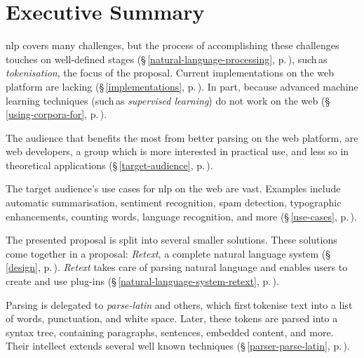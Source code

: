 
\begingroup
\let\clearpage\relax
\let\cleardoublepage\relax
\let\cleardoublepage\relax

\chapter*{Executive Summary}

\gls{nlp} covers many challenges, but the process of accomplishing
  these challenges touches on well-defined stages
  (§\,\ref{natural-language-processing},
  p.\,\pageref{natural-language-processing}), such\,as \emph{tokenisation},
  the focus of the proposal.
Current implementations on the web platform are lacking
  (§\,\ref{implementations}, p.\,\pageref{implementations}).
In part, because advanced machine learning techniques (such\,as
  \emph{supervised learning}) do not work on the web
  (§\,\ref{using-corpora-for}, p.\,\pageref{using-corpora-for}).

The audience that benefits the most from better parsing on the web platform,
  are web developers, a group which is more interested in practical use, and
  less so in theoretical applications
  (§\,\ref{target-audience}, p.\,\pageref{target-audience}).

The target audience's use cases for \gls{nlp} on the web are vast.
Examples include automatic summarisation, sentiment recognition, spam
  detection, typographic enhancements, counting words, language recognition,
  and more (§\,\ref{use-cases}, p.\,\pageref{use-cases}).

The presented proposal is split into several smaller solutions.
These solutions come together in a proposal: \emph{Retext}, a complete
  natural language system (§\,\ref{design}, p.\,\pageref{design}).
\emph{Retext} takes care of parsing natural language and enables users to
  create and use plug-ins (§\,\ref{natural-language-system-retext},
  p.\,\pageref{natural-language-system-retext}).

Parsing is delegated to \emph{parse-latin} and others, which first\,tokenise
  text into a list of words, punctuation, and white space.
Later, these tokens are parsed into a syntax tree, containing paragraphs,
  sentences, embedded content, and more. Their intellect extends several well
  known techniques (§\,\ref{parser-parse-latin},
  p.\,\pageref{parser-parse-latin}).

